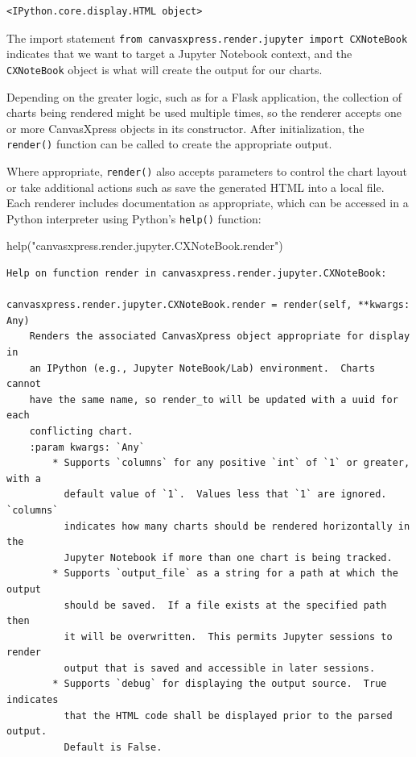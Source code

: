 \documentclass[
  letterpaper,
  DIV=11,
  numbers=noendperiod]{scrartcl}
\newenvironment{Shaded}{\begin{snugshade}}{\end{snugshade}}
\newcommand{\BuiltInTok}[1]{\textcolor[rgb]{0.00,0.23,0.31}{#1}}
\newcommand{\NormalTok}[1]{\textcolor[rgb]{0.00,0.23,0.31}{#1}}
\newcommand{\StringTok}[1]{\textcolor[rgb]{0.13,0.47,0.30}{#1}}
\begin{document}
\begin{verbatim}
<IPython.core.display.HTML object>
\end{verbatim}

The import statement
\texttt{from\ canvasxpress.render.jupyter\ import\ CXNoteBook} indicates
that we want to target a Jupyter Notebook context, and the
\texttt{CXNoteBook} object is what will create the output for our
charts.

Depending on the greater logic, such as for a Flask application, the
collection of charts being rendered might be used multiple times, so the
renderer accepts one or more CanvasXpress objects in its constructor.
After initialization, the \texttt{render()} function can be called to
create the appropriate output.

Where appropriate, \texttt{render()} also accepts parameters to control
the chart layout or take additional actions such as save the generated
HTML into a local file. Each renderer includes documentation as
appropriate, which can be accessed in a Python interpreter using
Python's \texttt{help()} function:

\begin{Shaded}
\begin{Highlighting}[]
\BuiltInTok{help}\NormalTok{(}\StringTok{"canvasxpress.render.jupyter.CXNoteBook.render"}\NormalTok{)}
\end{Highlighting}
\end{Shaded}

\begin{verbatim}
Help on function render in canvasxpress.render.jupyter.CXNoteBook:

canvasxpress.render.jupyter.CXNoteBook.render = render(self, **kwargs: Any)
    Renders the associated CanvasXpress object appropriate for display in
    an IPython (e.g., Jupyter NoteBook/Lab) environment.  Charts cannot
    have the same name, so render_to will be updated with a uuid for each
    conflicting chart.
    :param kwargs: `Any`
        * Supports `columns` for any positive `int` of `1` or greater, with a
          default value of `1`.  Values less that `1` are ignored.  `columns`
          indicates how many charts should be rendered horizontally in the
          Jupyter Notebook if more than one chart is being tracked.
        * Supports `output_file` as a string for a path at which the output
          should be saved.  If a file exists at the specified path then
          it will be overwritten.  This permits Jupyter sessions to render
          output that is saved and accessible in later sessions.
        * Supports `debug` for displaying the output source.  True indicates
          that the HTML code shall be displayed prior to the parsed output.
          Default is False.
\end{verbatim}
\end{document}
